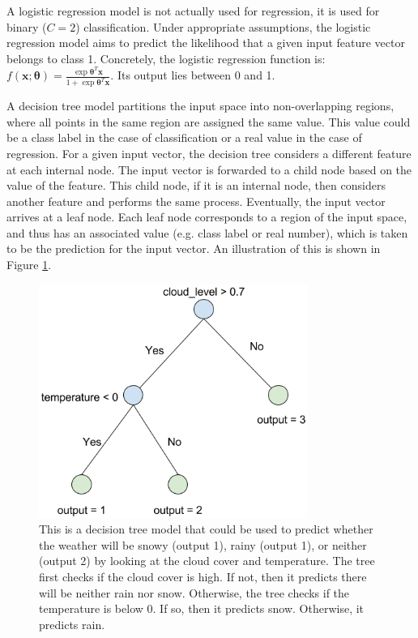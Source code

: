 A logistic regression model is not actually used for regression, it is used for 
binary ($C=2$) classification. Under appropriate assumptions, the logistic 
regression model aims to predict the likelihood that a given input feature vector
belongs to class 1. Concretely, the logistic regression function is: 
$f(\textbf{x}; \boldsymbol{\theta}) = \frac{\exp{\boldsymbol{\theta}^{T}\textbf{x}}}{1 + \exp{\boldsymbol{\theta}^{T}\textbf{x}}}$.
Its output lies between 0 and 1.

A decision tree model partitions the input space into non-overlapping regions, where all
points in the same region are assigned the same value. This value could be a class label
in the case of classification or a real value in the case of regression. For a given input vector,
the decision tree considers a different feature at each internal node. The input vector is forwarded
to a child node based on the value of the feature. This child node, if it is an internal node, then considers another
feature and performs the same process. Eventually, the input vector arrives at a leaf node. Each leaf node corresponds to
a region of the input space, and thus has an associated value (e.g. class label or real number), which is taken
to be the prediction for the input vector. An illustration of this is shown in Figure \ref{fig:sample_decision_tree}.

\begin{figure}
  \centering
  \includegraphics[height=3.0in]{sample_decision_tree}
  \caption{This is a decision tree model that could be used to predict whether the
  weather will be snowy (output 1), rainy (output 1), or neither (output 2) by
  looking at the cloud cover and temperature. The tree first checks if the cloud cover
  is high. If not, then it predicts there will be neither rain nor snow. Otherwise, the
  tree checks if the temperature is below 0. If so, then it predicts snow. Otherwise, it
  predicts rain.}
  \label{fig:sample_decision_tree}
\end{figure}

